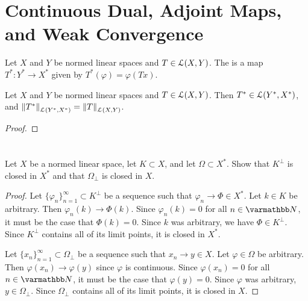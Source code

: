 \section{Continuous Dual, Adjoint Maps, and Weak Convergence}

\begin{definition}
Let $X$ and $Y$ be normed linear spaces and $T \in \mathcal{L}(X,Y)$. The  is a map $T^\ast:Y^\ast \rightarrow X^\ast$ given by $T^\ast(\varphi) = \varphi(Tx)$.
\end{definition}

\begin{proposition}
    Let $X$ and $Y$ be normed linear spaces and $T \in \mathcal{L}(X,Y)$. Then $T^\ast \in \mathcal{L}(Y^\ast,X^\ast)$, and $\left\lVert T^\ast \right\rVert_{\mathcal{L}(Y^\ast,X^\ast)} = \left\lVert T \right\rVert_{\mathcal{L}(X,Y)}$.
\end{proposition}
    {\color{red} \begin{proof}
    \end{proof}}

\section*{}

\begin{exercise}\label{exercise:banach-perp-is-closed}
    Let $X$ be a normed linear space, let $K \subset X$, and let $\Omega \subset X^\ast$. Show that $K^\perp$ is closed in $X^\ast$ and that $\Omega_{\perp}$ is closed in $X$.
\end{exercise}
    \begin{proof}
        Let $\{\varphi_n\}_{n = 1}^\infty \subset K^\perp$ be a sequence such that $\varphi_n \rightarrow \varPhi \in X^\ast$. Let $k \in K$ be arbitrary. Then $\varphi_n(k) \rightarrow \varPhi(k)$. Since $\varphi_n(k) = 0$ for all $n \in \bfN$, it must be the case that $\varPhi(k) = 0$. Since $k$ was arbitrary, we have $\varPhi \in K^\perp$. Since $K^\perp$ contains all of its limit points, it is closed in $X^\ast$.

        Let $\{x_n\}_{n = 1}^\infty \subset \Omega_\perp$ be a sequence such that $x_n \rightarrow y \in X$. Let $\varphi \in \Omega$ be arbitrary. Then $\varphi(x_n) \rightarrow \varphi(y)$ since $\varphi$ is continuous. Since $\varphi(x_n) = 0$ for all $n \in \bfN$, it must be the case that $\varphi(y) = 0$. Since $\varphi$ was arbitrary, $y \in \Omega_\perp$. Since $\Omega_\perp$ contains all of its limit points, it is closed in $X$.
    \end{proof}

